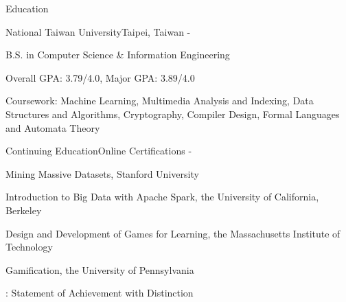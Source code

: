\documentclass{cv}
\begin{document}
\begin{cvHeader} 
\end{cvHeader}


\begin{cvSection}{Education}

\begin{eduSubsection}{National Taiwan University}{Taipei, Taiwan}{ - }

\item B.S. in Computer Science \& Information Engineering
\item Overall GPA: 3.79/4.0, Major GPA: 3.89/4.0
\item Coursework: Machine Learning, Multimedia Analysis and Indexing, Data Structures and Algorithms, Cryptography, Compiler Design, Formal Languages and Automata Theory
\end{eduSubsection}

\begin{eduSubsection}{Continuing Education}{Online Certifications}{ - }
\item *Mining Massive Datasets, Stanford University %
\item Introduction to Big Data with Apache Spark, the University of California, Berkeley %
\item Design and Development of Games for Learning, the Massachusetts Institute of Technology %
\item Gamification, the University of Pennsylvania %

\hfill {\footnotesize *: Statement of Achievement with Distinction}

\end{eduSubsection}

\end{cvSection}

\end{document}
